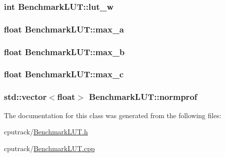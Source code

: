 \subsubsection[{\texorpdfstring{lut\+\_\+w}{lut_w}}]{\setlength{\rightskip}{0pt plus 5cm}int Benchmark\+L\+U\+T\+::lut\+\_\+w}\hypertarget{class_benchmark_l_u_t_a3ea5fe14b9dbfb664d7adc6697bf55d6}{}\label{class_benchmark_l_u_t_a3ea5fe14b9dbfb664d7adc6697bf55d6}
\subsubsection[{\texorpdfstring{max\+\_\+a}{max_a}}]{\setlength{\rightskip}{0pt plus 5cm}float Benchmark\+L\+U\+T\+::max\+\_\+a}\hypertarget{class_benchmark_l_u_t_a0db0d7dfca5146b0d10b2c2f11364203}{}\label{class_benchmark_l_u_t_a0db0d7dfca5146b0d10b2c2f11364203}
\subsubsection[{\texorpdfstring{max\+\_\+b}{max_b}}]{\setlength{\rightskip}{0pt plus 5cm}float Benchmark\+L\+U\+T\+::max\+\_\+b}\hypertarget{class_benchmark_l_u_t_a9c4c87c9ba7e98d01109e5db7a8538bd}{}\label{class_benchmark_l_u_t_a9c4c87c9ba7e98d01109e5db7a8538bd}
\subsubsection[{\texorpdfstring{max\+\_\+c}{max_c}}]{\setlength{\rightskip}{0pt plus 5cm}float Benchmark\+L\+U\+T\+::max\+\_\+c}\hypertarget{class_benchmark_l_u_t_a279c5583569ce6db1f1b921906de7ce5}{}\label{class_benchmark_l_u_t_a279c5583569ce6db1f1b921906de7ce5}
\subsubsection[{\texorpdfstring{normprof}{normprof}}]{\setlength{\rightskip}{0pt plus 5cm}std\+::vector$<$float$>$ Benchmark\+L\+U\+T\+::normprof}\hypertarget{class_benchmark_l_u_t_ad5ef40ecabab7c747d42180e9e82fe21}{}\label{class_benchmark_l_u_t_ad5ef40ecabab7c747d42180e9e82fe21}


The documentation for this class was generated from the following files\+:\begin{DoxyCompactItemize}
\item 
cputrack/\hyperlink{_benchmark_l_u_t_8h}{Benchmark\+L\+U\+T.\+h}\item 
cputrack/\hyperlink{_benchmark_l_u_t_8cpp}{Benchmark\+L\+U\+T.\+cpp}\end{DoxyCompactItemize}
